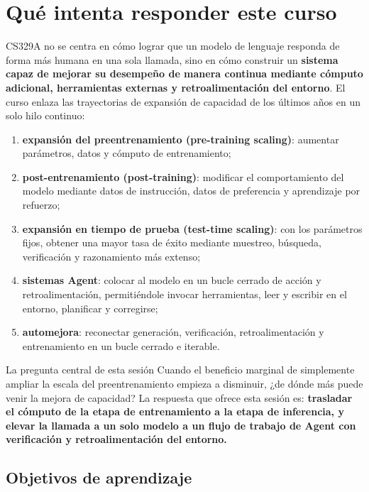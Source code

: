 \section{Qué intenta responder este curso}

CS329A no se centra en cómo lograr que un modelo de lenguaje responda de forma más humana en una sola llamada, sino en cómo construir un \textbf{sistema capaz de mejorar su desempeño de manera continua mediante cómputo adicional, herramientas externas y retroalimentación del entorno}. El curso enlaza las trayectorias de expansión de capacidad de los últimos años en un solo hilo continuo:

\begin{enumerate}
    \item \textbf{expansión del preentrenamiento (pre-training scaling)}: aumentar parámetros, datos y cómputo de entrenamiento;
    \item \textbf{post-entrenamiento (post-training)}: modificar el comportamiento del modelo mediante datos de instrucción, datos de preferencia y aprendizaje por refuerzo;
    \item \textbf{expansión en tiempo de prueba (test-time scaling)}: con los parámetros fijos, obtener una mayor tasa de éxito mediante muestreo, búsqueda, verificación y razonamiento más extenso;
    \item \textbf{sistemas Agent}: colocar al modelo en un bucle cerrado de acción y retroalimentación, permitiéndole invocar herramientas, leer y escribir en el entorno, planificar y corregirse;
    \item \textbf{automejora}: reconectar generación, verificación, retroalimentación y entrenamiento en un bucle cerrado e iterable.
\end{enumerate}

\begin{importantbox}{La pregunta central de esta sesión}
Cuando el beneficio marginal de simplemente ampliar la escala del preentrenamiento empieza a disminuir, ¿de dónde más puede venir la mejora de capacidad? La respuesta que ofrece esta sesión es: \textbf{trasladar el cómputo de la etapa de entrenamiento a la etapa de inferencia, y elevar la llamada a un solo modelo a un flujo de trabajo de Agent con verificación y retroalimentación del entorno.}
\end{importantbox}

\subsection{Objetivos de aprendizaje}

